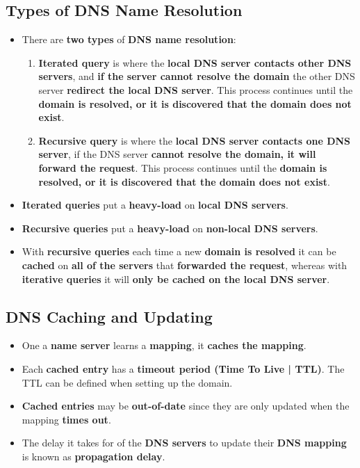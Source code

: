 \documentclass[16pt]{article}
\begin{document}
    \subsection*{Types of DNS Name Resolution}
    \begin{itemize}
        \item There are \textbf{two types} of \textbf{DNS name resolution}:
        \begin{enumerate}
            \item \textbf{Iterated query} is where the \textbf{local DNS server contacts other DNS servers}, and \textbf{if the server cannot resolve the domain} the other DNS server \textbf{redirect the local DNS server}. This process continues until the \textbf{domain is resolved, or it is discovered that the domain does not exist}.
            \item \textbf{Recursive query} is where the \textbf{local DNS server contacts one DNS server}, if the DNS server \textbf{cannot resolve the domain, it will forward the request}. This process continues until the \textbf{domain is resolved, or it is discovered that the domain does not exist}.
        \end{enumerate}
        \item \textbf{Iterated queries} put a \textbf{heavy-load} on \textbf{local DNS servers}.
        \item \textbf{Recursive queries} put a \textbf{heavy-load} on \textbf{non-local DNS servers}.
        \item With \textbf{recursive queries} each time a new \textbf{domain is resolved} it can be \textbf{cached} on \textbf{all of the servers} that \textbf{forwarded the request}, whereas with \textbf{iterative queries} it will \textbf{only be cached on the local DNS server}.
    \end{itemize}

    \subsection*{DNS Caching and Updating}
    \begin{itemize}
        \item One a \textbf{name server} learns a \textbf{mapping}, it \textbf{caches the mapping}.
        \item Each \textbf{cached entry} has a \textbf{timeout period (Time To Live | TTL)}. The TTL can be defined when setting up the domain.
        \item \textbf{Cached entries} may be \textbf{out-of-date} since they are only updated when the mapping \textbf{times out}.
        \item The delay it takes for of the \textbf{DNS servers} to update their \textbf{DNS mapping} is known as \textbf{propagation delay}.
    \end{itemize}
\end{document}
